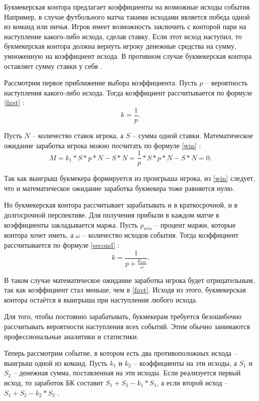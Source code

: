 Букмекерская контора предлагает коэффициенты на возможные исходы события. Например, в случае футбольного матча такими исходами является победа одной из команд или ничья. Игрок имеет возможность заключить с конторой пари на наступление какого-либо исхода, сделав ставку. Если этот исход наступил, то букмекерская контора должна вернуть игроку денежные средства на сумму, умноженную на коэффициент исхода. В противном случае букмекерская контора оставляет сумму ставки у себя \cite{kfs}.

Рассмотрим первое приближение выбора коэффициента. Пусть $p$ -- вероятность наступления какого-либо исхода. 
Тогда коэффициент рассчитывается по формуле \ref{first} \cite{kfs}: 
\begin{equation}\label{first}
k = \frac{1}{p}.
\end{equation}

Пусть $N$ -- количество ставок игрока, а $S$ -- сумма одной ставки. 
Математическое ожидание заработка игрока можно посчитать по формуле \ref{win} \cite{kfs}:
\begin{equation}\label{win} 
M = k_1 * S * p * N - S * N = \frac{1}{p} * S * p * N - S * N = 0.
\end{equation}

Так как выигрыш букмекера формируется из проигрыша игрока, из \ref{win} следует, что и математическое ожидание заработка букмекера тоже равняется нулю.

Но букмекерская контора рассчитывает зарабатывать и в краткосрочной, и в долгосрочной перспективе. 
Для получения прибыли в каждом матче в коэффициенты закладывается маржа. 
Пусть $p_{win}$ -- процент маржи, которые контора хочет иметь, а $\omega$ -- количество исходов события. 
Тогда коэффициент рассчитывается по формуле \ref{second} \cite{kfs}:
\begin{equation}\label{second}
k = \frac{1}{p + \frac{p_{win}}{\omega}}.
\end{equation}

В таком случае математическое ожидание заработка игрока будет отрицательным, так как коэффициент стал меньше, чем в \ref{first}. 
Исходя из этого, букмекерская контора остаётся в выигрыша при наступлении любого исхода.

Для того, чтобы постоянно зарабатывать, букмекерам требуется безошибочно рассчитывать вероятности наступления всех событий. 
Этим обычно занимаются профессиональные аналитики и статистики.

Теперь рассмотрим событие, в котором есть два противоположных исхода -- выигрыш одной из команд. Пусть $k_1$ и $k_2$ -- коэффициенты на эти исходы, а $S_1$ и $S_2$ -- денежная сумма, поставленная на эти исходы. 
Если реализуется первый исход, то заработок БК составит $S_1 + S_2 - k_1 * S_1$, а если второй исход -- $S_1 + S_2 - k_2 * S_2$ \cite{kfs}. 


